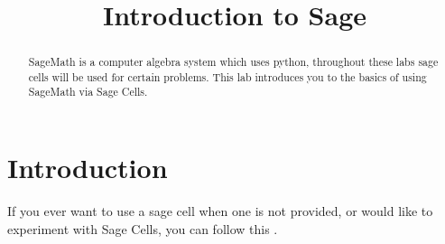 \documentclass{ximera}
\title{Introduction to Sage}
\begin{document}
\begin{abstract}
SageMath is a computer algebra system which uses python, throughout these labs sage cells will be used for certain problems. This lab introduces you to the basics of using SageMath via Sage Cells.
\end{abstract}
\maketitle
\section{Introduction}
If you ever want to use a sage cell when one is not provided, or would like to experiment with Sage Cells, you can follow this .
\end{document}
